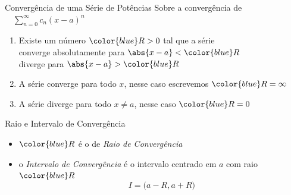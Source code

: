 %
%
%
%

\begin{frame}{Convergência de uma Série de Potências}
  Sobre a convergência de
  \(\quad\sum_{n=0}^\infty c_n(x-a)^n\quad\)

  \pause
  \vspace{\baselineskip}
  \begin{enumerate}[<+->]
    \item Existe um número ${\color{blue}R>0}$ tal que a série \\[1mm]
          \tabto{10mm} converge absolutamente para \tabto{70mm} \(\abs{x-a}<{\color{blue}R}\) \\
          \tabto{10mm} diverge para                \tabto{70mm} \(\abs{x-a}>{\color{blue}R}\)
    \vspace{\baselineskip}
    \item A série converge para todo $x$, nesse caso escrevemos ${\color{blue}R=\infty}$
    \vspace{\baselineskip}
    \item A série diverge para todo $x\neq a$, nesse caso ${\color{blue}R=0}$
  \end{enumerate}
\end{frame}

\begin{frame}{Raio e Intervalo de Convergência}
  \begin{itemize}[<+->]
    \item \({\color{blue}R}\) é o de \emph{Raio de Convergência} \\[\baselineskip]
    \item o \emph{Intervalo de Convergência} é o intervalo centrado em \(a\) com raio ${\color{blue}R}$
          \[
            I = \big( a-R, a+R \big)
          \]
  \end{itemize}

\end{frame}

